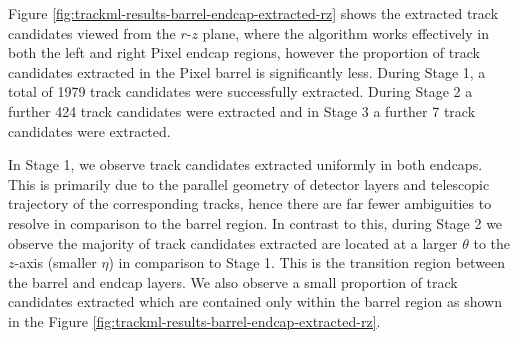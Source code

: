 Figure \ref{fig:trackml-results-barrel-endcap-extracted-rz} shows the extracted track candidates viewed from the $r$-$z$ plane, where the algorithm works effectively in both the left and right Pixel endcap regions, however the proportion of track candidates extracted in the Pixel barrel is significantly less. During Stage 1, a total of 1979 track candidates were successfully extracted. During Stage 2 a further 424 track candidates were extracted and in Stage 3 a further 7 track candidates were extracted.

In Stage 1, we observe track candidates extracted uniformly in both endcaps. This is primarily due to the parallel geometry of detector layers and telescopic trajectory of the corresponding tracks, hence there are far fewer ambiguities to resolve in comparison to the barrel region. In contrast to this, during Stage 2 we observe the majority of track candidates extracted are located at a larger $\theta$ to the $z$-axis (smaller $\eta$) in comparison to Stage 1. This is the transition region between the barrel and endcap layers. We also observe a small proportion of track candidates extracted which are contained only within the barrel region as shown in the Figure \ref{fig:trackml-results-barrel-endcap-extracted-rz}.


